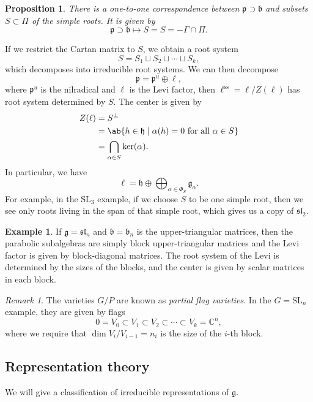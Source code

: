 \documentclass{amsart}
\newtheorem{prop}[thm]{Proposition}
\theoremstyle{definition}
\newtheorem{exm}[thm]{Example}
\theoremstyle{remark}
\newtheorem{rmk}[thm]{Remark}
\theoremstyle{plain}
\theoremstyle{definition}
\theoremstyle{remark}
\newcommand{\C}{\mathbb{C}}
\newcommand{\g}{\mathfrak{g}}
\newcommand{\h}{\mathfrak{h}}
\renewcommand{\b}{\mathfrak{b}}
\newcommand{\p}{\mathfrak{p}}
\newcommand{\mf}[1]{\mathfrak{#1}}
\newcommand{\mr}[1]{\mathrm{#1}}
\newcommand{\on}[1]{\operatorname{#1}}
\newcommand{\1}{\mathbf{1}}
\newcommand{\2}{\mathbf{2}}
\newcommand{\3}{\mathbf{3}}
\newcommand{\SL}{\mr{SL}}
\renewcommand{\sl}{\mf{sl}}
\begin{document}
\begin{prop}
    There is a one-to-one correspondence between \(\p \supset \b\) and subsets \(S \subset \Pi\) of the simple roots. It is given by
    \[ \p \supset \b \mapsto S = S = -\Gamma \cap \Pi. \]
\end{prop}

If we restrict the Cartan matrix to \(S\), we obtain a root system
\[ S = S_1 \sqcup S_2 \sqcup \cdots \sqcup S_k, \]
which decomposes into irreducible root systems. We can then decompose
\[ \p = \p^u \oplus \ell, \]
where \(\p^u\) is the nilradical and \(\ell\) is the Levi factor, then \(\ell^{\on{ss}} = \ell / Z(\ell)\) has root system determined by \(S\). The center is given by
\begin{align*}
    Z(\ell) &= S^{\perp} \\
    &= \ab\{ h \in \h \mid \alpha(h) = 0 \text{ for all } \alpha \in S \} \\
    &= \bigcap_{\alpha \in S} \ker(\alpha).
\end{align*} 
In particular, we have
\[ \ell = \h \oplus \bigoplus_{\alpha \in \Phi_S} \g_{\alpha}. \]
For example, in the \(\SL_3\) example, if we choose \(S\) to be one simple root, then we see only roots living in the span of that simple root, which gives us a copy of \(\sl_2\).

\begin{exm}
    If \(\g = \sl_n\) and \(\b = \b_n\) is the upper-triangular matrices, then the parabolic subalgebras are simply block upper-triangular matrices and the Levi factor is given by block-diagonal matrices. The root system of the Levi is determined by the sizes of the blocks, and the center is given by scalar matrices in each block.
\end{exm}

\begin{rmk}
    The varieties \(G/P\) are known as \textit{partial flag varieties}. In the \(G = \SL_n\) example, they are given by flags
    \[ 0 = V_0 \subset V_1 \subset V_2 \subset \cdots \subset V_k = \C^n, \]
    where we require that \(\dim V_i / V_{i-1} = n_i\) is the size of the \(i\)-th block.
\end{rmk}

\subsection{Representation theory}%
\label{sub:Representation theory}



We will give a classification of irreducible representations of \(\g\).
\end{document}
